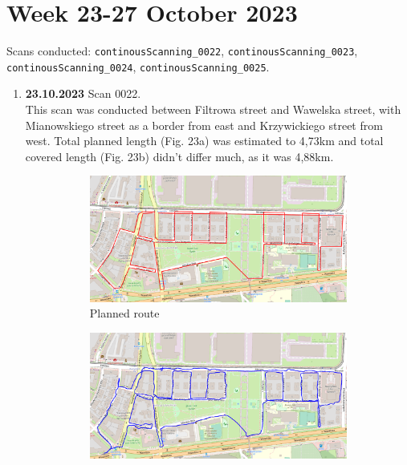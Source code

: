 \documentclass[a4paper,12pt]{article}
\begin{document}
\section{Week 23-27 October 2023}
Scans conducted: \verb|continousScanning_0022|, \verb|continousScanning_0023|, \verb|continousScanning_0024|, \verb|continousScanning_0025|.\\
\begin{enumerate}
	\item \textbf{23.10.2023} Scan 0022. \\
	This scan was conducted between Filtrowa street and Wawelska street, with Mianowskiego street as a border from east and Krzywickiego street from west. Total planned length (Fig. 23a) was estimated to 4,73km and total covered length (Fig. 23b) didn't differ much, as it was 4,88km.
	\pagebreak
	\begin{figure}[H]
		\centering
		\begin{subfigure}{.90\textwidth}
			\centering
			\includegraphics[width=1\linewidth]{route_p22}
			\caption{Planned route}
			\label{fig:a22}
		\end{subfigure}%
		\linebreak
		\begin{subfigure}{.90\textwidth}
			\centering
			\includegraphics[width=1\linewidth]{route_c22}

\end{subfigure}
\end{figure}
\end{enumerate}
\end{document}
